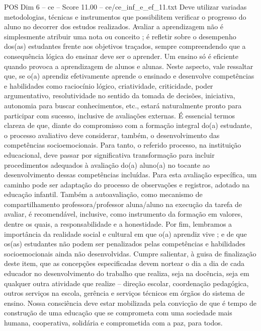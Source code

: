 \begin{textsample}{POS Dim 6 – ce – Score 11.00 – ce/ce\_inf\_e\_ef\_11.txt}
Deve utilizar variadas metodologias, técnicas e instrumentos que possibilitem verificar o progresso do aluno no decorrer dos estudos realizados.
Avaliar a aprendizagem não é simplesmente atribuir uma nota ou conceito ; é refletir sobre o desempenho dos(as) estudantes frente aos objetivos traçados, sempre compreendendo que a consequência lógica do ensinar deve ser o aprender.
Um ensino só é eficiente quando provoca a aprendizagem de alunos e alunas.
Neste aspecto, vale ressaltar que, se o(a) aprendiz efetivamente aprende o ensinado e desenvolve competências e habilidades como raciocínio lógico, criatividade, criticidade, poder argumentativo, resolutividade no sentido da tomada de decisões, iniciativa, autonomia para buscar conhecimentos, etc., estará naturalmente pronto para participar com sucesso, inclusive de avaliações externas.
É essencial termos clareza de que, diante do compromisso com a formação integral do(a) estudante, o processo avaliativo deve considerar, também, o desenvolvimento das competências socioemocionais.
Para tanto, o referido processo, na instituição educacional, deve passar por significativa transformação para incluir procedimentos adequados à avaliação do(a) aluno(a) no tocante ao desenvolvimento dessas competências incluídas.
Para esta avaliação específica, um caminho pode ser adaptação do processo de observações e registros, adotado na educação infantil.
Também a autoavaliação, como mecanismo de compartilhamento professora/professor aluna/aluno na execução da tarefa de avaliar, é recomendável, inclusive, como instrumento da formação em valores, dentre os quais, a responsabilidade e a honestidade.
Por fim, lembramos a importância da realidade social e cultural em que o(a) aprendiz vive ; e de que os(as) estudantes não podem ser penalizados pelas competências e habilidades socioemocionais ainda não desenvolvidas.
Cumpre salientar, à guisa de finalização deste item, que as concepções especificadas devem nortear o dia a dia de cada educador no desenvolvimento do trabalho que realiza, seja na docência, seja em qualquer outra atividade que realize – direção escolar, coordenação pedagógica, outros serviços na escola, gerência e serviços técnicos em órgãos do sistema de ensino.
Nossa consciência deve estar mobilizada pela convicção de que é tempo de construção de uma educação que se comprometa com uma sociedade mais humana, cooperativa, solidária e comprometida com a paz, para todos.

\end{textsample}
